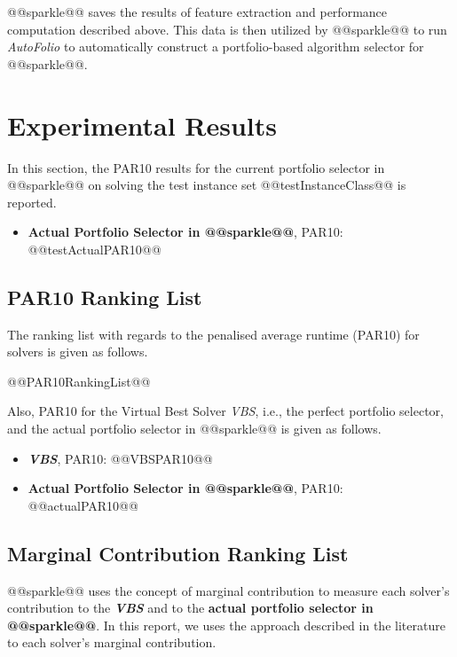\documentclass[british]{article}
\begin{document}
@@sparkle@@ saves the results of feature extraction and performance computation described above. This data is then utilized by @@sparkle@@ to run \emph{AutoFolio} \cite{LinEtAl15} to automatically construct a portfolio-based algorithm selector for @@sparkle@@.


\section{Experimental Results}
\label{sec:Experimental_Results}

In this section, the PAR10 results for the current portfolio selector in @@sparkle@@ on solving the test instance set @@testInstanceClass@@ is reported.

\begin{itemize}
\item \textbf{Actual Portfolio Selector in @@sparkle@@}, PAR10: @@testActualPAR10@@
\end{itemize}


\iffalse
\subsection{PAR10 Ranking List}
\label{sec:PAR10_Ranking}

The ranking list with regards to the penalised average runtime (PAR10) for solvers is given as follows.

\begin{enumerate}
@@PAR10RankingList@@
\end{enumerate}

Also, PAR10 for the Virtual Best Solver \emph{VBS}, i.e., the perfect portfolio selector, and the actual portfolio selector in @@sparkle@@ is given as follows.

\begin{itemize}
\item \textbf{\emph{VBS}}, PAR10: @@VBSPAR10@@
\item \textbf{Actual Portfolio Selector in @@sparkle@@}, PAR10: @@actualPAR10@@
\end{itemize}

\subsection{Marginal Contribution Ranking List}
\label{sec:Marginal_Contribution_Ranking}

@@sparkle@@ uses the concept of marginal contribution \cite{XuEtAl12} to measure each solver's contribution to the \textbf{\emph{VBS}} and to the \textbf{actual portfolio selector in @@sparkle@@}. In this report, we uses the approach described in the literature \cite{FreEtAl16} to each solver's marginal contribution.
\end{document}
